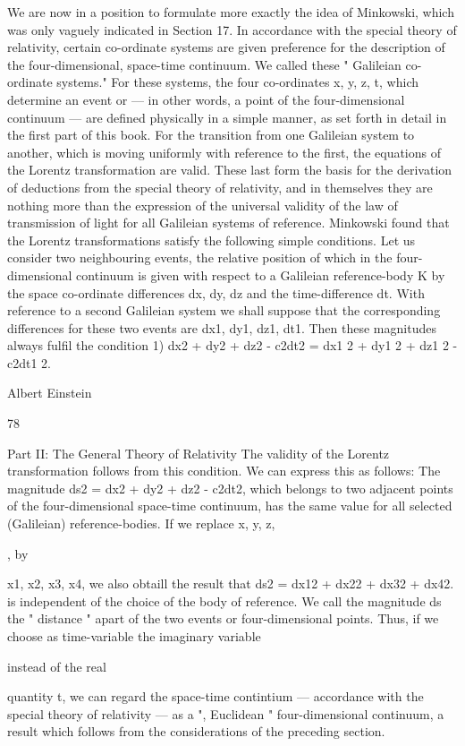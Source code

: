 \documentclass{article}
\begin{document}
We are now in a position to formulate more exactly the idea of Minkowski, which was
only vaguely indicated in Section 17. In accordance with the special theory of relativity,
certain co-ordinate systems are given preference for the description of the four-dimensional,
space-time continuum. We called these " Galileian co-ordinate systems." For these systems,
the four co-ordinates x, y, z, t, which determine an event or — in other words, a point of the
four-dimensional continuum — are defined physically in a simple manner, as set forth in
detail in the first part of this book. For the transition from one Galileian system to another,
which is moving uniformly with reference to the first, the equations of the Lorentz
transformation are valid. These last form the basis for the derivation of deductions from the
special theory of relativity, and in themselves they are nothing more than the expression of
the universal validity of the law of transmission of light for all Galileian systems of
reference.
Minkowski found that the Lorentz transformations satisfy the following simple
conditions. Let us consider two neighbouring events, the relative position of which in the
four-dimensional continuum is given with respect to a Galileian reference-body K by the
space co-ordinate differences dx, dy, dz and the time-difference dt. With reference to a
second Galileian system we shall suppose that the corresponding differences for these two
events are dx1, dy1, dz1, dt1. Then these magnitudes always fulfil the condition 1)
dx2 + dy2 + dz2 - c2dt2 = dx1 2 + dy1 2 + dz1 2 - c2dt1 2.

Albert Einstein

78

Part II: The General Theory of Relativity
The validity of the Lorentz transformation follows from this condition. We can express
this as follows: The magnitude
ds2 = dx2 + dy2 + dz2 - c2dt2,
which belongs to two adjacent points of the four-dimensional space-time continuum, has the
same value for all selected (Galileian) reference-bodies. If we replace x, y, z,

, by

x1, x2, x3, x4, we also obtaill the result that
ds2 = dx12 + dx22 + dx32 + dx42.
is independent of the choice of the body of reference. We call the magnitude ds the "
distance " apart of the two events or four-dimensional points.
Thus, if we choose as time-variable the imaginary variable

instead of the real

quantity t, we can regard the space-time contintium — accordance with the special theory of
relativity — as a ", Euclidean " four-dimensional continuum, a result which follows from
the considerations of the preceding section.
\end{document}

